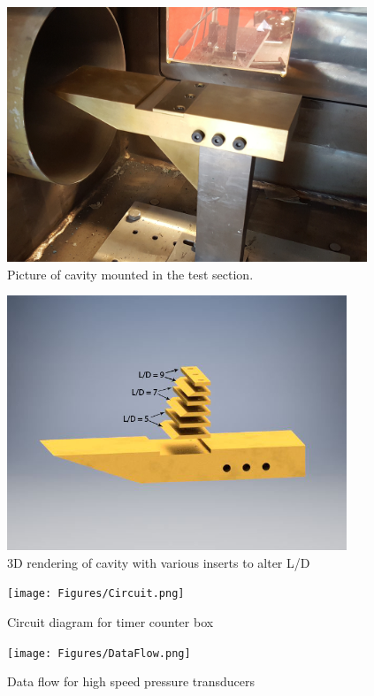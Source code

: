 \begin{figure}
\centering
\includegraphics[height = 3in]{Figures/cavPhoto.jpg}
\caption[Cavity in Test Section]{Picture of cavity mounted in the test section.}
\label{fig:cavTestSection}
\end{figure}

\begin{figure}
\centering
\includegraphics[height = 3in]{Figures/CavityInserts.jpg}
\caption[Cavity Model with Inserts]{3D rendering of cavity with various inserts to alter L/D}
\label{fig:cavInserts}
\end{figure}

\begin{figure}
\centering
\texttt{[image: Figures/Circuit.png]}
\caption[Circuit Diagram for Timer Counter Box]{Circuit diagram for timer counter box}
\label{fig:timercircuit}
\end{figure}


\begin{figure}[p!]
\centering
\texttt{[image: Figures/DataFlow.png]}
\caption[Data Flow for High Speed Pressure Transducers]{Data flow for high speed pressure transducers}
\label{fig:DataFlow}
\end{figure}
\clearpage

